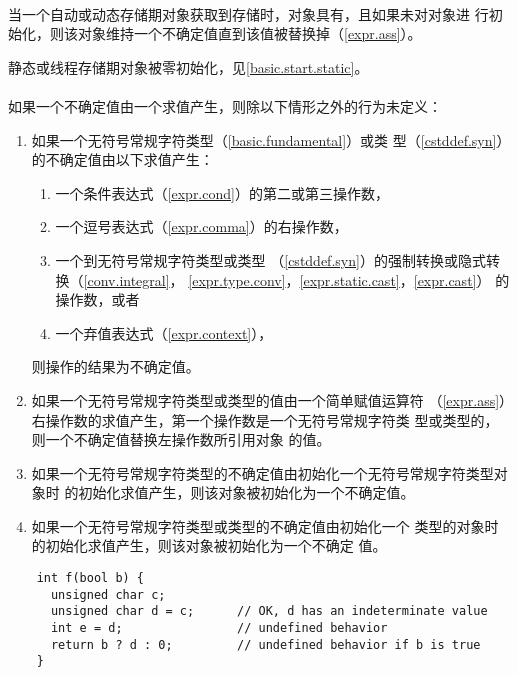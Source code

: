 \paragraph{} %
当一个自动或动态存储期对象获取到存储时，对象具有，且如果未对对象进
行初始化，则该对象维持一个不确定值直到该值被替换掉（\ref{expr.ass}）。

\begin{note}
  静态或线程存储期对象被零初始化，见\ref{basic.start.static}。
\end{note}

\paragraph{} %
如果一个不确定值由一个求值产生，则除以下情形之外的行为未定义：
\begin{enumerate}
  \item 如果一个无符号常规字符类型（\ref{basic.fundamental}）或类
        型（\ref{cstddef.syn}）的不确定值由以下求值产生：
        \begin{enumerate}
          \item 一个条件表达式（\ref{expr.cond}）的第二或第三操作数，
          \item 一个逗号表达式（\ref{expr.comma}）的右操作数，
          \item 一个到无符号常规字符类型或类型
                （\ref{cstddef.syn}）的强制转换或隐式转换（\ref{conv.integral}，
                \ref{expr.type.conv}，\ref{expr.static.cast}，\ref{expr.cast}）
                的操作数，或者
          \item 一个弃值表达式（\ref{expr.context}），
        \end{enumerate}
        则操作的结果为不确定值。
  \item 如果一个无符号常规字符类型或类型的值由一个简单赋值运算符
        （\ref{expr.ass}）右操作数的求值产生，第一个操作数是一个无符号常规字符类
        型或类型的\lvalue{}，则一个不确定值替换左操作数所引用对象
        的值。
  \item 如果一个无符号常规字符类型的不确定值由初始化一个无符号常规字符类型对象时
        的初始化求值产生，则该对象被初始化为一个不确定值。
  \item 如果一个无符号常规字符类型或类型的不确定值由初始化一个
        类型的对象时的初始化求值产生，则该对象被初始化为一个不确定
        值。
\end{enumerate}

\begin{example}
  \begin{lstlisting}
    int f(bool b) {
      unsigned char c;
      unsigned char d = c;      // OK, d has an indeterminate value
      int e = d;                // undefined behavior
      return b ? d : 0;         // undefined behavior if b is true
    }
  \end{lstlisting}
\end{example}
